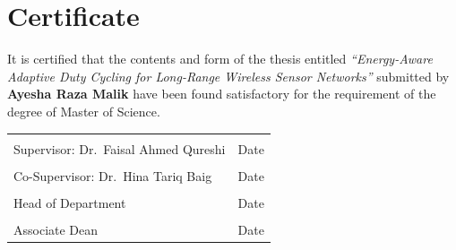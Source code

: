 \chapter*{Certificate}
\thispagestyle{plain}

\noindent It is certified that the contents and form of the thesis entitled
\emph{``Energy-Aware Adaptive Duty Cycling for Long-Range Wireless Sensor Networks''}
submitted by \textbf{Ayesha Raza Malik} have been found satisfactory for the requirement of
the degree of Master of Science.

\vspace{30pt}

\noindent
\begin{tabular}{@{}p{7cm}p{7cm}@{}}
\dotfill & \dotfill \\
Supervisor: Dr.\ Faisal Ahmed Qureshi & Date \\[26pt]
\dotfill & \dotfill \\
Co-Supervisor: Dr.\ Hina Tariq Baig & Date \\[26pt]
\dotfill & \dotfill \\
Head of Department & Date \\[26pt]
\dotfill & \dotfill \\
Associate Dean & Date \\
\end{tabular}

